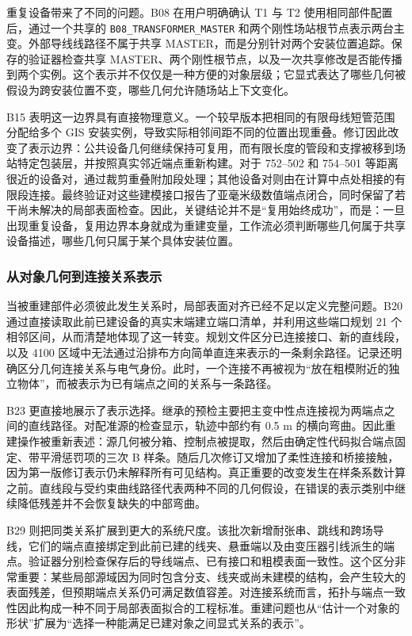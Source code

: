 \documentclass[10pt,a4paper]{article}
\begin{document}
重复设备带来了不同的问题。B08 在用户明确确认 T1 与 T2
使用相同部件配置后，通过一个共享的 \texttt{B08\_TRANSFORMER\_MASTER}
和两个刚性场站根节点表示两台主变。外部导线线路径不属于共享
MASTER，而是分别针对两个安装位置追踪。保存的验证器检查共享
MASTER、两个刚性根节点，以及一次共享修改是否能传播到两个实例。这个表示并不仅仅是一种方便的对象层级；它显式表达了哪些几何被假设为跨安装位置不变，哪些几何允许随场站上下文变化。

B15
表明这一边界具有直接物理意义。一个较早版本把相同的有限母线短管范围分配给多个
GIS
安装实例，导致实际相邻间距不同的位置出现重叠。修订因此改变了表示边界：公共设备几何继续保持可复用，而有限长度的管段和支撑被移到场站特定包装层，并按照真实邻近端点重新构建。对于
752--502 和 754--501
等距离很近的设备对，通过裁剪重叠附加段处理；其他设备对则由在计算中点处相接的有限段连接。最终验证对这些建模接口报告了亚毫米级数值端点闭合，同时保留了若干尚未解决的局部表面检查。因此，关键结论并不是``复用始终成功''，而是：一旦出现重复设备，复用边界本身就成为重建变量，工作流必须判断哪些几何属于共享设备描述，哪些几何只属于某个具体安装位置。

\hypertarget{ux4eceux5bf9ux8c61ux51e0ux4f55ux5230ux8fdeux63a5ux5173ux7cfbux8868ux793a}{%
\subsubsection{从对象几何到连接关系表示}\label{ux4eceux5bf9ux8c61ux51e0ux4f55ux5230ux8fdeux63a5ux5173ux7cfbux8868ux793a}}

当被重建部件必须彼此发生关系时，局部表面对齐已经不足以定义完整问题。B20
通过直接读取此前已建设备的真实末端建立端口清单，并利用这些端口规划 21
个相邻区间，从而清楚地体现了这一转变。规划文件区分已连接接口、新的直线段，以及
4100
区域中无法通过沿排布方向简单直连来表示的一条剩余路径。记录还明确区分几何连接关系与电气身份。此时，一个连接不再被视为``放在粗模附近的独立物体''，而被表示为已有端点之间的关系与一条路径。

B23
更直接地展示了表示选择。继承的预检主要把主变中性点连接视为两端点之间的直线路径。对配准源的检查显示，轨迹中部约有
0.5 m
的横向弯曲。因此重建操作被重新表述：源几何被分箱、控制点被提取，然后由确定性代码拟合端点固定、带平滑惩罚项的三次
B
样条。随后几次修订又增加了柔性连接和桥接接触，因为第一版修订表示仍未解释所有可见结构。真正重要的改变发生在样条系数计算之前。直线段与受约束曲线路径代表两种不同的几何假设，在错误的表示类别中继续降低残差并不会恢复缺失的中部弯曲。

B29
则把同类关系扩展到更大的系统尺度。该批次新增耐张串、跳线和跨场导线，它们的端点直接绑定到此前已建的线夹、悬垂端以及由变压器引线派生的端点。验证器分别检查保存后的导线端点、已有接口和粗模表面一致性。这个区分非常重要：某些局部源域因为同时包含分支、线夹或尚未建模的结构，会产生较大的表面残差，但预期端点关系仍可满足数值容差。对连接系统而言，拓扑与端点一致性因此构成一种不同于局部表面拟合的工程标准。重建问题也从``估计一个对象的形状''扩展为``选择一种能满足已建对象之间显式关系的表示''。
\end{document}
